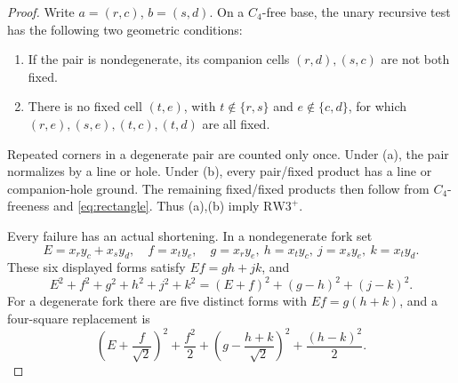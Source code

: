 \documentclass[11pt,a4paper]{article}
\theoremstyle{definition}
\newcommand{\RW}{\mathrm{RW3}^{+}}
\begin{document}
\begin{proof}
Write $a=(r,c)$, $b=(s,d)$. On a $C_4$-free base, the unary recursive
test has the following two geometric conditions:
\begin{enumerate}[label=(\alph*)]
\item If the pair is nondegenerate, its companion cells $(r,d),(s,c)$
      are not both fixed.
\item There is no fixed cell $(t,e)$, with $t\notin\{r,s\}$ and
      $e\notin\{c,d\}$, for which
      $(r,e),(s,e),(t,c),(t,d)$ are all fixed.
\end{enumerate}
Repeated corners in a degenerate pair are counted only once.
Under (a), the pair normalizes by a line or hole. Under (b), every
pair/fixed product has a line or companion-hole ground. The remaining
fixed/fixed products then follow from $C_4$-freeness and
\eqref{eq:rectangle}. Thus (a),(b) imply $\RW$.

Every failure has an actual shortening. In a nondegenerate fork set
\[
 E=x_ry_c+x_sy_d,\quad f=x_ty_e,\quad
 g=x_ry_e,\ h=x_ty_c,\ j=x_sy_e,\ k=x_ty_d.
\]
These six displayed forms satisfy $Ef=gh+jk$, and
\begin{equation}\label{eq:fork6}
 E^2+f^2+g^2+h^2+j^2+k^2
       =(E+f)^2+(g-h)^2+(j-k)^2.
\end{equation}
For a degenerate fork there are five distinct forms with $Ef=g(h+k)$,
and a four-square replacement is
\begin{equation}\label{eq:fork5}
 \left(E+\frac f{\sqrt2}\right)^2+\frac{f^2}{2}
 +\left(g-\frac{h+k}{\sqrt2}\right)^2+\frac{(h-k)^2}{2}.
\end{equation}


\end{proof}
\end{document}
